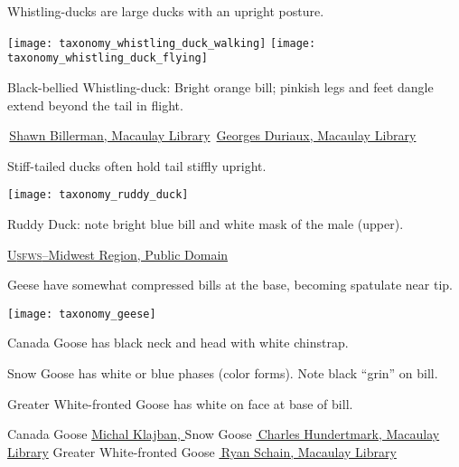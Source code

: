 \documentclass[t]{beamer}
\newcommand{\backoneline}{\vspace{-\baselineskip}}
\begin{document}
\begin{frame}[t]{Whistling-ducks are large ducks with an upright posture.}

\backoneline

\begin{multicols}{2}
%
\texttt{[image: taxonomy\_whistling\_duck\_walking]}
%
\columnbreak
%
\texttt{[image: taxonomy\_whistling\_duck\_flying]}
%
\end{multicols}

\backoneline


Black-bellied Whistling-duck: Bright orange bill; pinkish legs and feet dangle extend beyond the tail in flight. 

\vfilll

\tiny \textcopyright\,\href{https://macaulaylibrary.org/asset/35646961}{Shawn Billerman, Macaulay Library} \hfill \textcopyright\,\href{https://macaulaylibrary.org/asset/54166281}{Georges Duriaux, Macaulay Library}

\end{frame}
%

\begin{frame}{Stiff-tailed ducks often hold tail stiffly upright.}

\vspace{-\baselineskip}

\begin{multicols}{2}
\texttt{[image: taxonomy\_ruddy\_duck]}

\columnbreak

Ruddy Duck: note bright blue bill and white mask of the male (upper).

\end{multicols}

\vfilll

\tiny \href{https://www.flickr.com/photos/49208525@N08/14409068487}{U\textsc{sfws}–Midwest Region, Public Domain} 
\end{frame}


\begin{frame}{Geese have somewhat compressed bills at the base, becoming spatulate near tip.}


\texttt{[image: taxonomy\_geese]}

Canada Goose has black neck and head with white chinstrap.

Snow Goose has white or blue phases (color forms). Note black “grin” on bill.

Greater White-fronted Goose has white on face at base of bill.

\vfilll

\tiny Canada Goose \href{https://commons.wikimedia.org/wiki/File:Canada_goose_(Branta_canadensis),_Lake_Victoria,_Christchurch,_New_Zealand_04.jpg}{Michal Klajban, } 
\hfill 
Snow Goose \href{https://macaulaylibrary.org/asset/47881261}{\textcopyright\,Charles Hundertmark, Macaulay Library}
\hfill
Greater White-fronted Goose \href{https://macaulaylibrary.org/asset/36909271}{\textcopyright\,Ryan Schain, Macaulay Library}


\end{frame}
\end{document}
